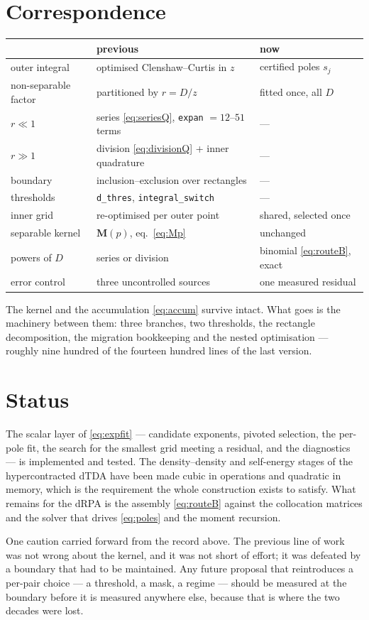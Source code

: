 \documentclass[11pt]{article}
\newcommand{\mat}[1]{{\mathbf{#1}}}
\newcommand{\code}[1]{\texttt{\small #1}}
\begin{document}
\section{Correspondence}

\begin{center}
\begin{tabular}{lll}
\toprule
 & previous & now \\
\midrule
outer integral & optimised Clenshaw--Curtis in $z$ & certified poles $s_j$ \\
non-separable factor & partitioned by $r = D/z$ & fitted once, all $D$ \\
$r \ll 1$ & series \eqref{eq:seriesQ}, \code{expan} $= 12$--$51$ terms & --- \\
$r \gg 1$ & division \eqref{eq:divisionQ} + inner quadrature & --- \\
boundary & inclusion--exclusion over rectangles & --- \\
thresholds & \code{d\_thres}, \code{integral\_switch} & --- \\
inner grid & re-optimised per outer point & shared, selected once \\
separable kernel & $\mat{M}(p)$, eq.~\eqref{eq:Mp} & unchanged \\
powers of $D$ & series or division & binomial \eqref{eq:routeB}, exact \\
error control & three uncontrolled sources & one measured residual \\
\bottomrule
\end{tabular}
\end{center}

The kernel and the accumulation \eqref{eq:accum} survive intact. What goes is the machinery
between them: three branches, two thresholds, the rectangle decomposition, the migration
bookkeeping and the nested optimisation --- roughly nine hundred of the fourteen hundred
lines of the last version.

\section{Status}

The scalar layer of \eqref{eq:expfit} --- candidate exponents, pivoted selection, the
per-pole fit, the search for the smallest grid meeting a residual, and the diagnostics ---
is implemented and tested. The density--density and self-energy stages of the
hypercontracted dTDA have been made cubic in operations and quadratic in memory, which is
the requirement the whole construction exists to satisfy. What remains for the dRPA is the
assembly \eqref{eq:routeB} against the collocation matrices and the solver that drives
\eqref{eq:poles} and the moment recursion.

One caution carried forward from the record above. The previous line of work was not wrong
about the kernel, and it was not short of effort; it was defeated by a boundary that had to
be maintained. Any future proposal that reintroduces a per-pair choice --- a threshold, a
mask, a regime --- should be measured at the boundary before it is measured anywhere else,
because that is where the two decades were lost.
\end{document}
